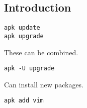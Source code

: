
\subsection{Introduction}

\begin{verbatim}
apk update
apk upgrade
\end{verbatim}
These can be combined.

\begin{verbatim}
apk -U upgrade
\end{verbatim}


Can install new packages.

\begin{verbatim}
apk add vim
\end{verbatim}
